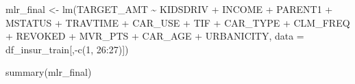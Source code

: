 \documentclass[
]{article}
\newenvironment{Shaded}{\begin{snugshade}}{\end{snugshade}}
\newcommand{\AttributeTok}[1]{\textcolor[rgb]{0.77,0.63,0.00}{#1}}
\newcommand{\DecValTok}[1]{\textcolor[rgb]{0.00,0.00,0.81}{#1}}
\newcommand{\FunctionTok}[1]{\textcolor[rgb]{0.00,0.00,0.00}{#1}}
\newcommand{\NormalTok}[1]{#1}
\newcommand{\OtherTok}[1]{\textcolor[rgb]{0.56,0.35,0.01}{#1}}
\newcommand{\SpecialCharTok}[1]{\textcolor[rgb]{0.00,0.00,0.00}{#1}}
\begin{document}
\begin{Shaded}
\begin{Highlighting}[]
\NormalTok{mlr\_final }\OtherTok{\textless{}{-}} \FunctionTok{lm}\NormalTok{(TARGET\_AMT }\SpecialCharTok{\textasciitilde{}}\NormalTok{ KIDSDRIV }\SpecialCharTok{+}\NormalTok{ INCOME }\SpecialCharTok{+}\NormalTok{ PARENT1 }\SpecialCharTok{+}\NormalTok{ MSTATUS }\SpecialCharTok{+}
\NormalTok{                  TRAVTIME }\SpecialCharTok{+}\NormalTok{ CAR\_USE }\SpecialCharTok{+}\NormalTok{ TIF }\SpecialCharTok{+}\NormalTok{ CAR\_TYPE }\SpecialCharTok{+}\NormalTok{ CLM\_FREQ }\SpecialCharTok{+}\NormalTok{ REVOKED }\SpecialCharTok{+}
\NormalTok{                  MVR\_PTS }\SpecialCharTok{+}\NormalTok{ CAR\_AGE }\SpecialCharTok{+}\NormalTok{ URBANICITY,}
                \AttributeTok{data =}\NormalTok{ df\_insur\_train[,}\SpecialCharTok{{-}}\FunctionTok{c}\NormalTok{(}\DecValTok{1}\NormalTok{, }\DecValTok{26}\SpecialCharTok{:}\DecValTok{27}\NormalTok{)])}
\end{Highlighting}
\end{Shaded}

\begin{Shaded}
\begin{Highlighting}[]
\FunctionTok{summary}\NormalTok{(mlr\_final)}
\end{Highlighting}
\end{Shaded}
\end{document}
